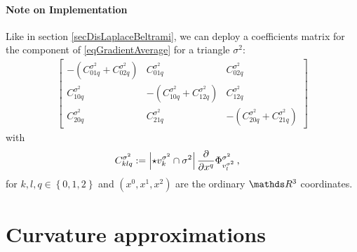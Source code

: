       \paragraph{Note on Implementation}
        Like in section \ref{secDisLaplaceBeltrami}, we can deploy a coefficients matrix for the  component of 
        \eqref{eqGradientAverage} for a triangle \( \sigma^{2} \):
        \begin{align}
            \begin{bmatrix}
              -\left( C^{\sigma^{2}}_{01q} + C^{\sigma^{2}}_{02q}\right) & C^{\sigma^{2}}_{01q} & C^{\sigma^{2}}_{02q} \\
              C^{\sigma^{2}}_{10q} & -\left( C^{\sigma^{2}}_{10q} + C^{\sigma^{2}}_{12q}\right) & C^{\sigma^{2}}_{12q} \\
              C^{\sigma^{2}}_{20q} & C^{\sigma^{2}}_{21q} & -\left( C^{\sigma^{2}}_{20q} + C^{\sigma^{2}}_{21q}\right)
            \end{bmatrix}
        \end{align}
        with 
        \begin{align}
          C^{\sigma^{2}}_{klq} &:= \left| \star v_{k}^{\sigma^{2}} \cap \sigma^{2} \right|
                                   \frac{\partial}{\partial x^{q}} \Phi^{\sigma^{2}}_{v_{l}^{\sigma^{2}}} \,\text{,}
        \end{align}
        for \( k,l,q\in\left\{ 0,1,2 \right\} \) 
        and \( \left( x^{0}, x^{1}, x^{2} \right) \) are the ordinary \( \R^{3} \) coordinates.

        



      
\section{Curvature approximations}
